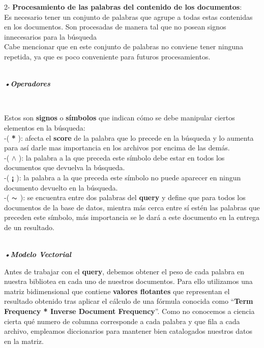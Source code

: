 \documentclass[12pt,a4paper,onecolumn]{report}
\begin{document}
\begin{flushleft}
\begin{large}
2-\textbf{ Procesamiento de las palabras del contenido de los
documentos}:
\\
Es necesario tener un conjunto de palabras que agrupe a todas
estas contenidas en los documentos. Son procesadas de manera
tal que no posean signos innecesarios para la búsqueda\\
Cabe mencionar que en este conjunto de palabras no conviene
tener ninguna repetida, ya que es poco conveniente para futuros
procesamientos.

\end{large}

\begin{LARGE}
\textbf{\\\emph{•Operadores}}
\end{LARGE}\\

\begin{large}

Estos son \textbf{signos} o \textbf{símbolos} que indican cómo se debe manipular
ciertos elementos en la búsqueda:\\

-(\textbf{ * }): afecta el \textbf{score} de la palabra que lo precede en la
búsqueda y lo aumenta para así darle mas importancia en los
archivos por encima de las demás.\\

-(\textbf{ $\wedge$ }): la palabra a la que preceda este símbolo debe estar en
todos los documentos que devuelva la búsqueda.\\

-( \textbf{¡ }): la palabra a la que preceda este símbolo no puede
aparecer en ningun documento devuelto en la búsqueda.\\

-(\textbf{ $\thicksim$ }): se encuentra entre dos palabras del \textbf{query} y define que
para todos los documentos de la base de datos, mientra más
cerca entre sí estén las palabras que preceden este símbolo, más
importancia se le dará a este documento en la entrega de un
resultado.

\end{large}

\begin{LARGE}
\textbf{\\\emph{•Modelo Vectorial}}
\end{LARGE}

\begin{large}


Antes de trabajar con el \textbf{query}, debemos obtener el peso de cada
palabra en nuestra bibliotea en cada uno de nuestros
documentos. Para ello utilizamos una matriz bidimensional que
contiene \textbf{valores flotantes} que representan el resultado obtenido
tras aplicar el cálculo de una fórmula conocida como “\textbf{Term
Frequency * Inverse Document Frequency}”. Como no conocemos
a ciencia cierta qué numero de columna corresponde a cada
palabra y que fila a cada archivo, empleamos diccionarios para
mantener bien catalogados nuestros datos en la matriz.\\


\end{large}
\end{flushleft}
\end{document}
